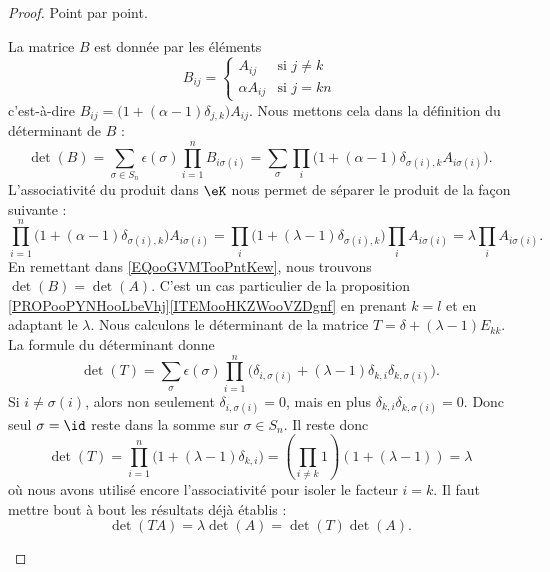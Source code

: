\begin{proof}
	Point par point.
	\begin{subproof}
		\spitem[\ref{ITEMooBKIGooCDQEDt}]
		La matrice \( B\) est donnée par les éléments
		\begin{equation}
			B_{ij}=\begin{cases}
				A_{ij}        & \text{si } j\neq k \\
				\alpha A_{ij} & \text{si } j=kn
			\end{cases}
		\end{equation}
		c'est-à-dire \( B_{ij}=\big( 1+(\alpha-1)\delta_{j,k} \big)A_{ij}\). Nous mettons cela dans la définition du déterminant de \( B\) :
		\begin{equation}        \label{EQooGVMTooPntKew}
			\det(B)=\sum_{\sigma\in S_n}\epsilon(\sigma)\prod_{i=1}^nB_{i\sigma(i)}=\sum_{\sigma}\prod_i\big( 1+(\alpha-1)\delta_{\sigma(i),k}A_{i\sigma(i)} \big).
		\end{equation}
		L'associativité du produit dans \( \eK\) nous permet de séparer le produit de la façon suivante :
		\begin{equation}
			\prod_{i=1}^n\big( 1+(\alpha-1)\delta_{\sigma(i),k} \big)A_{i\sigma(i)}=\prod_i\big( 1+(\lambda-1)\delta_{\sigma(i),k} \big)\prod_iA_{i\sigma(i)}=\lambda\prod_iA_{i\sigma(i)}.
		\end{equation}
		En remettant dans \eqref{EQooGVMTooPntKew}, nous trouvons \( \det(B)=\det(A)\).
		\spitem[\ref{ITEMooWRRCooFXkRNW}]
		C'est un cas particulier de la proposition \ref{PROPooPYNHooLbeVhj}\ref{ITEMooHKZWooVZDgnf} en prenant \( k=l\) et en adaptant le \( \lambda\).
		\spitem[\ref{ITEMooOGGDooPVVRzk}]
		Nous calculons le déterminant de la matrice \( T=\delta+(\lambda-1)E_{kk}\). La formule du déterminant donne
		\begin{equation}
			\det(T)=\sum_{\sigma}\epsilon(\sigma)\prod_{i=1}^n\big( \delta_{i,\sigma(i)}+(\lambda-1)\delta_{k,i}\delta_{k,\sigma(i)} \big).
		\end{equation}
		Si \( i\neq \sigma(i)\), alors non seulement \( \delta_{i,\sigma(i)}=0\), mais en plus \( \delta_{k,i}\delta_{k,\sigma(i)}=0\). Donc seul \( \sigma=\id\) reste dans la somme sur \( \sigma\in S_n\). Il reste donc
		\begin{equation}
			\det(T)=\prod_{i=1}^n\big( 1+(\lambda-1)\delta_{k,i} \big)=\left( \prod_{i\neq k}1 \right)(1+(\lambda-1))=\lambda
		\end{equation}
		où nous avons utilisé encore l'associativité pour isoler le facteur \( i=k\).
		\spitem[\ref{ITEMooIFRVooWQYgkK}]
		Il faut mettre bout à bout les résultats déjà établis :
		\begin{equation}
			\det(TA)=\lambda\det(A)=\det(T)\det(A).
		\end{equation}
	\end{subproof}
\end{proof}

